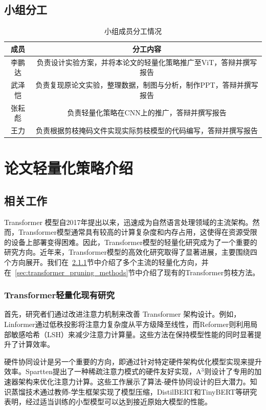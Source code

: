 \documentclass[UTF8,openany]{ctexbook}
\begin{document}
\section{小组分工}
\begin{table}[h]
\centering
\begin{tabular}{|c|c|}
\hline
\textbf{成员} & \textbf{分工内容} \\
\hline
李鹏达 & 负责设计实验方案，并将本论文的轻量化策略推广至ViT，答辩并撰写报告 \\
\hline
武泽恺 & 负责复现原论文实验，整理数据，制图与分析，制作PPT，答辩并撰写报告 \\
\hline
张耘彪 & 负责轻量化策略在CNN上的推广，答辩并撰写报告\\
\hline
王力 &  负责根据剪枝掩码文件实现实际剪枝模型的代码编写，答辩并撰写报告\\
\hline
\end{tabular}
\caption{小组成员分工情况}
\end{table}

\chapter{论文轻量化策略介绍}

\section{相关工作}

Transformer \cite{vaswani2017attention}模型自2017年提出以来，迅速成为自然语言处理领域的主流架构。然而，Transformer模型通常具有较高的计算复杂度和内存占用，这使得在资源受限的设备上部署变得困难。因此，Transformer模型的轻量化研究成为了一个重要的研究方向。近年来，Transformer模型的高效化研究取得了显著进展，主要围绕四个方向展开。我们在~\ref{sec:transformer_pruning}节中介绍了多个主流的轻量化方向，并在~\ref{sec:transformer_pruning_methods}节中介绍了现有的Transformer剪枝方法。

\subsection{Transformer轻量化现有研究}
\label{sec:transformer_pruning}

首先，研究者们通过改进注意力机制来改善 Transformer 架构设计。例如，Linformer\cite{wang2020linformer}通过低秩投影将注意力复杂度从平方级降至线性，而Reformer\cite{kitaev2020reformer}则利用局部敏感哈希（LSH）来减少注意力计算量。这些方法在保持模型性能的同时显著提升了计算效率。

硬件协同设计是另一个重要的方向，即通过针对特定硬件架构优化模型实现来提升效率。Spartten\cite{wang2021spatten}提出了一种稀疏注意力模式的硬件友好实现，A$^3$\cite{ham2020a3}则设计了专用的加速器架构来优化注意力计算。这些工作展示了算法-硬件协同设计的巨大潜力。知识蒸馏技术通过教师-学生框架实现了模型压缩，DistilBERT\cite{sanh2019distilbert}和TinyBERT\cite{jiao2020tinybert}等研究表明，经过适当训练的小型模型可以达到接近原始大模型的性能。
\end{document}
